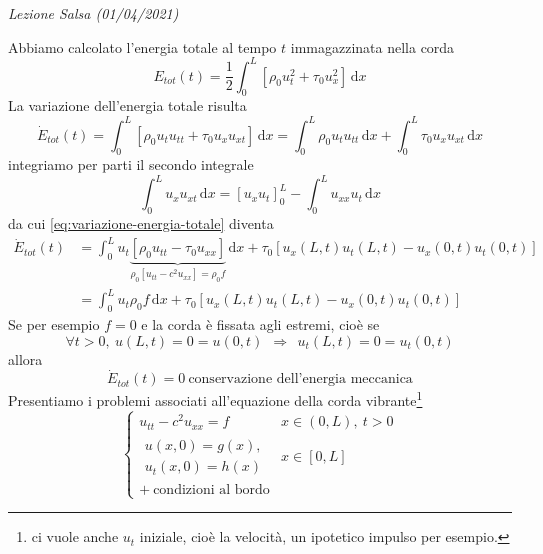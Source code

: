 \documentclass[10pt,a4paper,twoside,openright]{book}
\newcounter{conteggioS}
\newcommand{\LezioneS}[1]{
	\stepcounter{conteggioS}
	\textit{Lezione Salsa \arabic{conteggioS} (#1)}
	}
\newcommand{\de}{\,\mathrm d}
\newcommand{\dx}{\de x}
\begin{document}
\LezioneS{01/04/2021}

Abbiamo calcolato l'energia totale al tempo $t$ immagazzinata nella corda
\begin{equation*}
	E_{tot}(t) =\frac{1}{2}\int ^{L}_{0}\left[ \rho _{0} u^{2}_{t} +\tau _{0} u^{2}_{x}\right] \dx
\end{equation*}
La variazione dell'energia totale risulta
\begin{equation}
	\dot{E}_{tot}(t) =\int ^{L}_{0}[ \rho _{0} u_{t} u_{tt} +\tau _{0} u_{x} u_{xt}] \dx=\int ^{L}_{0} \rho _{0} u_{t} u_{tt} \dx+\int ^{L}_{0} \tau _{0} u_{x} u_{xt} \dx
	\label{eq:variazione-energia-totale}
\end{equation}
integriamo per parti il secondo integrale
\begin{equation*}
	\int ^{L}_{0} u_{x} u_{xt} \dx=[ u_{x} u_{t}]^{L}_{0} -\int ^{L}_{0} u_{xx} u_{t} \dx
\end{equation*}
da cui \eqref{eq:variazione-energia-totale} diventa
\begin{align*}
	\dot{E}_{tot}(t) & =\int ^{L}_{0} u_{t}\underbrace{[ \rho _{0} u_{tt} -\tau _{0} u_{xx}]}_{\rho _{0}\left[ u_{tt} -c^{2} u_{xx}\right] =\rho _{0} f} \dx+\tau _{0}[ u_{x}(L,t) u_{t}(L,t) -u_{x}(0,t) u_{t}(0,t)] \\
	                  & =\int ^{L}_{0} u_{t} \rho _{0} f\dx+\tau _{0}[ u_{x}(L,t) u_{t}(L,t) -u_{x}(0,t) u_{t}(0,t)]                                                                                                   
\end{align*}
Se per esempio $f=0$ e la corda è fissata agli estremi, cioè se
\begin{equation*}
	\forall t >0,\ u(L,t) =0=u(0,t) \ \ \Rightarrow \ \ u_{t}(L,t) =0=u_{t}(0,t)
\end{equation*}
allora
\begin{equation*}
	\dot{E}_{tot}(t) =0\ \text{conservazione dell'energia meccanica}
\end{equation*}
Presentiamo i problemi associati all'equazione della corda vibrante\footnote{ci vuole anche $u_{t}$ iniziale, cioè la velocità, un ipotetico impulso per esempio.}
\begin{equation*}
	\begin{cases}
		u_{tt} -c^{2} u_{xx} =f       & x\in (0,L) ,\ t >0 \\
		\begin{array}{l}
		u(x,0) =g(x) ,\\
		u_{t}(x,0) =h(x)
		\end{array}                   & x\in [ 0,L]         \\
		+\ \text{condizioni al bordo} &                     
	\end{cases}
\end{equation*}
\end{document}

